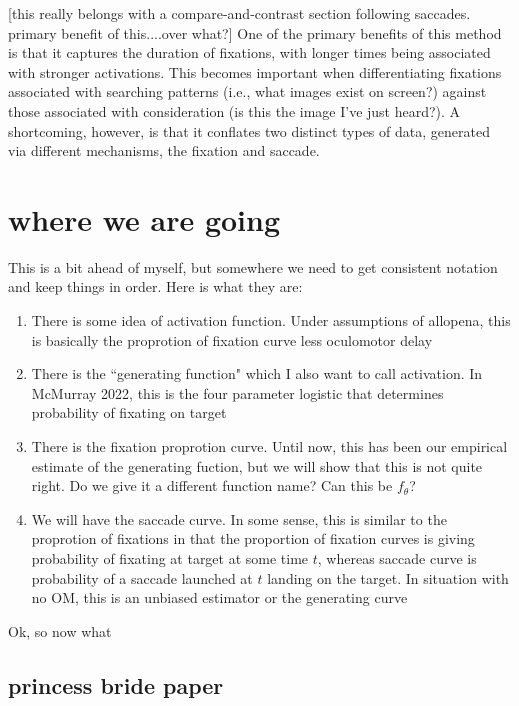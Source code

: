 \documentclass{article}
\begin{document}
[this really belongs with a compare-and-contrast section following saccades. primary benefit of this....over what?] One of the primary benefits of this method is that it captures the duration of fixations, with longer times being associated with stronger activations. This becomes important when differentiating fixations associated with searching patterns (i.e., what images exist on screen?) against those associated with consideration (is this the image I've just heard?). A shortcoming, however, is that it conflates two distinct types of data, generated via different mechanisms, the fixation and saccade. 

\section{where we are going} 


This is a bit ahead of myself, but somewhere we need to get consistent notation and keep things in order. Here is what they are:

\begin{singlespace}
\begin{enumerate}
\vspace{-3mm}
\item There is some idea of activation function. Under assumptions of allopena, this is basically the proprotion of fixation curve less oculomotor delay
\item There is the ``generating function" which I also want to call activation. In McMurray 2022, this is the four parameter logistic that determines probability of fixating on target
\item There is the fixation proprotion curve. Until now, this has been our empirical estimate of the generating fuction, but we will show that this is not quite right. Do we give it a different function name? Can this be $f_{\theta}$?
\item We will have the saccade curve. In some sense, this is similar to the proprotion of fixations in that the proportion of fixation curves is giving probability of fixating at target at some time $t$, whereas saccade curve is probability of a saccade launched at $t$ landing on the target. In situation with no OM, this is an unbiased estimator or the generating curve
\end{enumerate}
\end{singlespace}

Ok, so now what

\subsection{princess bride paper}
\end{document}
